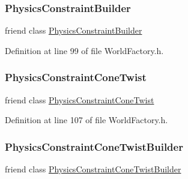 \subsubsection{\texorpdfstring{Physics\+Constraint\+Builder}{PhysicsConstraintBuilder}}
{\footnotesize\ttfamily friend class \mbox{\hyperlink{classnjli_1_1_physics_constraint_builder}{Physics\+Constraint\+Builder}}\hspace{0.3cm}{\ttfamily [friend]}}



Definition at line 99 of file World\+Factory.\+h.

\mbox{\label{classnjli_1_1_world_factory_a2ccf10571ac5c97189a4c7d1fe3831ae}} 
\subsubsection{\texorpdfstring{Physics\+Constraint\+Cone\+Twist}{PhysicsConstraintConeTwist}}
{\footnotesize\ttfamily friend class \mbox{\hyperlink{classnjli_1_1_physics_constraint_cone_twist}{Physics\+Constraint\+Cone\+Twist}}\hspace{0.3cm}{\ttfamily [friend]}}



Definition at line 107 of file World\+Factory.\+h.

\mbox{\label{classnjli_1_1_world_factory_a80d4d8b5e97b1f9310737e5230e0ca67}} 
\subsubsection{\texorpdfstring{Physics\+Constraint\+Cone\+Twist\+Builder}{PhysicsConstraintConeTwistBuilder}}
{\footnotesize\ttfamily friend class \mbox{\hyperlink{classnjli_1_1_physics_constraint_cone_twist_builder}{Physics\+Constraint\+Cone\+Twist\+Builder}}\hspace{0.3cm}{\ttfamily [friend]}}



